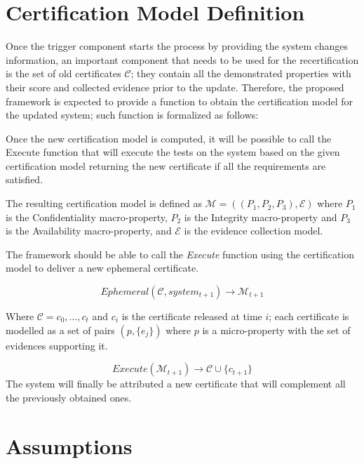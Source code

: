 \section{Certification Model Definition}
Once the trigger component starts the process by providing the system changes information, an important component that needs to be used for the recertification is the set of old certificates \(\mathcal{C}\); they contain all the demonstrated properties with their score and collected evidence prior to the update. Therefore, the proposed framework is expected to provide a function to obtain the certification model for the updated system; such function is formalized as follows:



Once the new certification model is computed, it will be possible to call the Execute function that will execute the tests on the system based on the given certification model returning the new certificate if all the requirements are satisfied.


The resulting certification model is defined as 
\(\mathcal{M} = \left ( \left ( P_1, P_2, P_3 \right ), \mathcal{E} \right )\) where \(P_1\) is the Confidentiality macro-property, \(P_2\) is the Integrity macro-property and \(P_3\) is the Availability macro-property, and \( \mathcal{E} \) is the evidence collection model.
 
The framework should be able to call the \textit{Execute} function using the certification model to deliver a new ephemeral certificate.

\[Ephemeral(\mathcal{C}, system_{t+1}) \rightarrow {\mathcal{M}}_{t+1} \]

Where \( \mathcal{C} = {c_0, \dots , c_t} \) and \(c_i\) is the certificate released at time \(i\); each certificate is modelled as a set of pairs \( (p, \{e_j\}) \) where \(p\) is a micro-property with the set of evidences supporting it.

\[ Execute(\mathcal{M}_{t+1}) \rightarrow \mathcal{C} \cup \{c_{t+1}\} \]
The system will finally be attributed a new certificate that will complement all the previously obtained ones.


\section{Assumptions}

